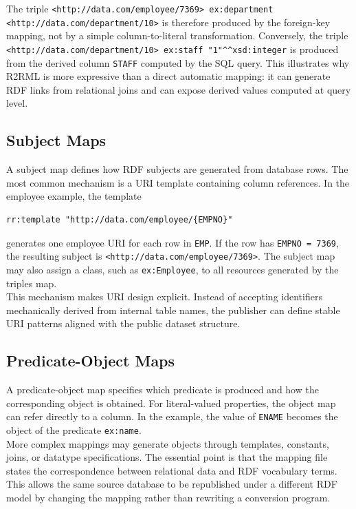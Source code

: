\documentclass{scrbook}
\begin{document}
	The triple \texttt{<http://data.com/employee/7369> ex:department <http://data.com/department/10>} is therefore produced by the foreign-key mapping, not by a simple column-to-literal transformation. Conversely, the triple \texttt{<http://data.com/department/10> ex:staff "1"\string^\string^xsd:integer} is produced from the derived column \texttt{STAFF} computed by the SQL query. This illustrates why R2RML is more expressive than a direct automatic mapping: it can generate RDF links from relational joins and can expose derived values computed at query level.
	
	\subsection{Subject Maps}
	
	A subject map defines how RDF subjects are generated from database rows. The most common mechanism is a URI template containing column references. In the employee example, the template
	
	\begin{lstlisting}
rr:template "http://data.com/employee/{EMPNO}"
	\end{lstlisting}
	
	generates one employee URI for each row in \texttt{EMP}. If the row has \texttt{EMPNO = 7369}, the resulting subject is \texttt{<http://data.com/employee/7369>}. The subject map may also assign a class, such as \texttt{ex:Employee}, to all resources generated by the triples map.\\
	
	This mechanism makes URI design explicit. Instead of accepting identifiers mechanically derived from internal table names, the publisher can define stable URI patterns aligned with the public dataset structure.
	
	\subsection{Predicate-Object Maps}
	
	A predicate-object map specifies which predicate is produced and how the corresponding object is obtained. For literal-valued properties, the object map can refer directly to a column. In the example, the value of \texttt{ENAME} becomes the object of the predicate \texttt{ex:name}.\\
	
	More complex mappings may generate objects through templates, constants, joins, or datatype specifications. The essential point is that the mapping file states the correspondence between relational data and RDF vocabulary terms. This allows the same source database to be republished under a different RDF model by changing the mapping rather than rewriting a conversion program.
	
\end{document}

